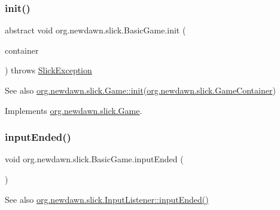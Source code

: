 \subsubsection{\texorpdfstring{init()}{init()}}
{\footnotesize\ttfamily abstract void org.\+newdawn.\+slick.\+Basic\+Game.\+init (\begin{DoxyParamCaption}\item[{\mbox{\hyperlink{classorg_1_1newdawn_1_1slick_1_1_game_container}{Game\+Container}}}]{container }\end{DoxyParamCaption}) throws \mbox{\hyperlink{classorg_1_1newdawn_1_1slick_1_1_slick_exception}{Slick\+Exception}}\hspace{0.3cm}{\ttfamily [abstract]}}

\begin{DoxySeeAlso}{See also}
\mbox{\hyperlink{interfaceorg_1_1newdawn_1_1slick_1_1_game_ad2dd6affab08bb8fdb5fab0815957b7a}{org.\+newdawn.\+slick.\+Game\+::init}}(\mbox{\hyperlink{classorg_1_1newdawn_1_1slick_1_1_game_container}{org.\+newdawn.\+slick.\+Game\+Container}}) 
\end{DoxySeeAlso}


Implements \mbox{\hyperlink{interfaceorg_1_1newdawn_1_1slick_1_1_game_ad2dd6affab08bb8fdb5fab0815957b7a}{org.\+newdawn.\+slick.\+Game}}.

\mbox{\label{classorg_1_1newdawn_1_1slick_1_1_basic_game_ab1d3867ead6bd9dc922c8e90a1ccc0c3}} 
\subsubsection{\texorpdfstring{input\+Ended()}{inputEnded()}}
{\footnotesize\ttfamily void org.\+newdawn.\+slick.\+Basic\+Game.\+input\+Ended (\begin{DoxyParamCaption}{ }\end{DoxyParamCaption})\hspace{0.3cm}{\ttfamily [inline]}}

\begin{DoxySeeAlso}{See also}
\mbox{\hyperlink{interfaceorg_1_1newdawn_1_1slick_1_1_controlled_input_reciever_a61c6cde7cbf28a6969cafe3ec4f1c121}{org.\+newdawn.\+slick.\+Input\+Listener\+::input\+Ended()}} 
\end{DoxySeeAlso}


